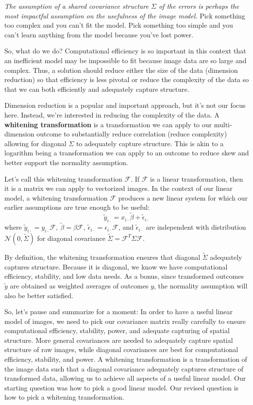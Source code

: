 \documentclass[12pt]{article}
\begin{document}
\textit{The assumption of a shared covariance structure $\Sigma$ of the errors is perhaps the most impactful assumption on the usefulness of the image model.} Pick something too complex and you can't fit the model. Pick something too simple and you can't learn anything from the model because you've lost power.

So, what do we do? Computational efficiency is so important in this context that an inefficient model may be impossible to fit because image data are so large and complex. Thus, a solution should reduce either the size of the data (dimension reduction) so that efficiency is less pivotal or reduce the complexity of the data so that we can both efficiently and adequately capture structure.

Dimension reduction is a popular and important approach, but it's not our focus here. Instead, we're interested in reducing the complexity of the data. A \textbf{whitening transformation} is a transformation we can apply to our multi-dimension outcome to substantially reduce correlation (reduce complexity) allowing for diagonal $\Sigma$ to adequately capture structure. This is akin to a logarithm being a transformation we can apply to an outcome to reduce skew and better support the normality assumption. 

Let's call this whitening transformation $\mathcal F$. If $\mathcal F$ is a linear transformation, then it is a matrix we can apply to vectorized images. In the context of our linear model, a whitening transformation $\mathcal F$ produces a new linear system for which our earlier assumptions are true enough to be useful:
$$\tilde y_{i\cdot}=x_{i\cdot}\tilde\beta+\tilde\epsilon_{i\cdot}$$
where $\tilde y_{i\cdot}=y_{i\cdot}\mathcal F,\ \tilde\beta=\beta\mathcal F,\ \tilde\epsilon_{i\cdot}=\epsilon_{i\cdot}\mathcal F$, and $\tilde\epsilon_{i\cdot}$ are independent with distribution $\mathcal N(0,\tilde\Sigma)$ for diagonal covariance $\tilde\Sigma=\mathcal F^T\Sigma\mathcal F$.

By definition, the whitening transformation ensures that diagonal $\tilde\Sigma$ adequately captures structure. Because it is diagonal, we know we have computational efficiency, stability, and low data needs. As a bonus, since transformed outcomes $\tilde y$ are obtained as weighted averages of outcomes $y$, the normality assumption will also be better satisfied.

So, let's pause and summarize for a moment: In order to have a useful linear model of images, we need to pick our covariance matrix really carefully to ensure computational efficiency, stability, power, and adequate capturing of spatial structure. More general covariances are needed to adequately capture spatial structure of raw images, while diagonal covariances are best for computational efficiency, stability, and power. A whitening transformation is a transformation of the image data such that a diagonal covariance adequately captures structure of transformed data, allowing us to achieve all aspects of a useful linear model. Our starting question was how to pick a good linear model. Our revised question is how to pick a whitening transformation.
\end{document}
